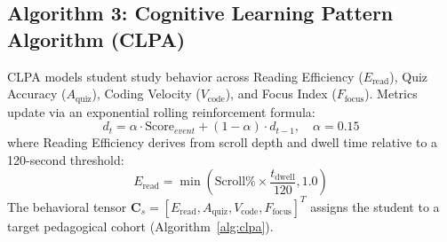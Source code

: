 \documentclass[conference]{IEEEtran}
\begin{document}
\subsection{Algorithm 3: Cognitive Learning Pattern Algorithm (CLPA)}
CLPA models student study behavior across Reading Efficiency ($E_{\text{read}}$), Quiz Accuracy ($A_{\text{quiz}}$), Coding Velocity ($V_{\text{code}}$), and Focus Index ($F_{\text{focus}}$). Metrics update via an exponential rolling reinforcement formula:
\begin{equation}
d_t = \alpha \cdot \text{Score}_{event} + (1 - \alpha) \cdot d_{t-1}, \quad \alpha = 0.15
\label{eq:clpa}
\end{equation}
where Reading Efficiency derives from scroll depth and dwell time relative to a 120-second threshold:
\begin{equation}
E_{\text{read}} = \min\left( \text{Scroll\%} \times \frac{t_{\text{dwell}}}{120}, 1.0 \right)
\end{equation}
The behavioral tensor $\mathbf{C}_s = [E_{\text{read}}, A_{\text{quiz}}, V_{\text{code}}, F_{\text{focus}}]^T$ assigns the student to a target pedagogical cohort (Algorithm~\ref{alg:clpa}).
\end{document}
